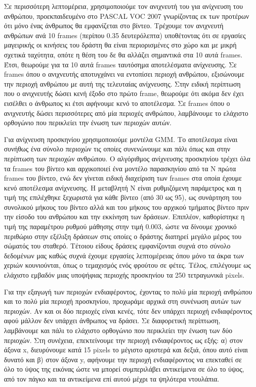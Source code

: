 \documentclass[11pt,a4paper,english,greek,twoside]{../Thesis}
\begin{document}
\par Σε περισσότερη λεπτομέρεια, χρησιμοποιούμε τον ανιχνευτή του \cite{felzenszwalb_2010} για ανίχνευση του ανθρώπου, προεκπαιδευμένο στο PASCAL VOC 2007 γνωρίζοντας εκ των προτέρων ότι μόνο ένας άνθρωπος θα εμφανίζεται στο βίντεο. Τρέχουμε τον ανιχνευτή ανθρώπων ανά 10 frames (περίπου 0.35 δευτερόλεπτα) υποθέτοντας ότι σε εργασίες μαγειρικής οι κινήσεις του δράστη θα είναι περιορισμένες στο χώρο και με μικρή σχετικά ταχύτητα, οπότε η θέση του δε θα αλλάζει σημαντικά στα 10 αυτά frames. Έτσι, θεωρούμε για τα 10 αυτά frames ταυτόσημα αποτελέσματα ανίχνευσης. Σε frames όπου ο ανιχνευτής αποτυγχάνει να εντοπίσει περιοχή ανθρώπου, εξισώνουμε την περιοχή ανθρώπου με αυτή της τελευταίας ανίχνευσης. Στην ειδική περίπτωση που ο ανιχνευτής δώσει κενή έξοδο στο πρώτο frame, θεωρούμε ότι ακόμα δεν έχει εισέλθει ο άνθρωπος κι έτσι αφήνουμε κενό το αποτέλεσμα. Σε frames όπου ο ανιχνευτής δώσει περισσότερες από μία περιοχές ανθρώπου, λαμβάνουμε το ελάχιστο ορθογώνιο που περικλείει την ένωση των περιοχών αυτών.

\par Για ανίχνευση προσκηνίου χρησιμοποιούμε μοντέλα GMM. Το αποτέλεσμα είναι συνήθως ένα σύνολο περιοχών τις οποίες συνενώνουμε και πάλι όπως και στην περίπτωση των περιοχών ανθρώπου. Ο αλγόριθμος ανίχνευσης προσκηνίου τρέχει όλα τα frames του βίντεο και αρχικοποιεί ένα μοντέλο παρασκηνίου από τα Ν πρώτα frames του βίντεο, ενώ δεν γίνεται ειδική διαχείριση των frames στα οποία έχουμε κενό αποτέλεσμα ανίχνευσης. Η μεταβλητή Ν είναι ρυθμιζόμενη παράμετρος και η τιμή της επιλέχθηκε ξεχωριστά για κάθε βίντεο (από 30 ως 95), ως συνάρτηση του συνολικού μήκους του βίντεο αλλά και του μήκους του αρχικού τμήματος βίντεο πριν την είσοδο του ανθρώπου και την εκκίνηση των δράσεων. Επιπλέον, καθορίστηκε η τιμή της παραμέτρου ρυθμού μάθησης στην τιμή 0.003, ώστε να δίνουμε χρονικό περιθώριο στην εξέλιξη δράσεων στις οποίες ο δράστης διατηρεί μεγάλο μέρος του σώματός του σταθερό. Τέτοιου είδους δράσεις εμφανίζονται συχνά στο σύνολο δεδομένων μας καθώς συχνά έχουμε εργασίες λεπτομέρειας όπου μόνο τα άκρα των χεριών κουνιούνται, όπως ο τεμαχισμός ενός φρούτου σε φέτες. Τέλος, επιλέγουμε ως ελάχιστο εμβαδόν μιας υποψήφιας περιοχής προσκηνίου τα 250 τετραγωνικά pixels.

\par Για την εξαγωγή των περιοχών ενδιαφέροντος, έχοντας το πολύ μία περιοχή ανθρώπου και το πολύ μία περιοχή προσκηνίου, προχωράμε αρχικά στη συνένωση αυτών των περιοχών. Αν και οι δύο περιοχές είναι κενές, τότε δεν υπάρχει περιοχή ενδιαφέροντος αφού μάλλον δεν υπάρχει άνθρωπος να δράσει. Σε διαφορετική περίπτωση, λαμβάνουμε και πάλι το ελάχιστο ορθογώνιο που περικλείει την ένωση των δύο περιοχών. Στη συνέχεια, επεκτείνουμε την περιοχή ενδιαφέροντος ως εξής: α) στον άξονα x, διευρύνουμε κατά 15 pixels το μέγιστο αριστερά και δεξιά, όπου αυτό είναι δυνατό και β) στον άξονα y, αφήνουμε την περιοχή ενδιαφέροντος να επεκταθεί σε όλο το ύψος της εικόνας ώστε να μπορεί συμπεριλάβει αντικείμενα σε όλο το ύψος, από τον πάγκο και τα αντικείμενα επί αυτού μέχρι τα ψηλότερα ντουλάπια.
\end{document}
